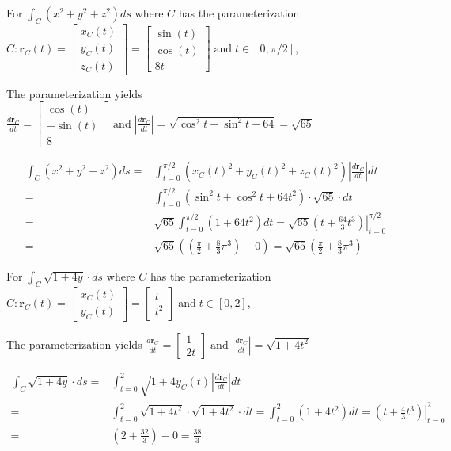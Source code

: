 \documentclass{article}
\newcommand{\abs}[1]{\left|#1\right|}
\newcommand{\at}[1]{\left. #1 \right|}
\newcommand{\dr}[1]{\textcolor{dark_red}{#1}}
\begin{document}
\begin{framed}
\dr{For \(\int_C (x^2 + y^2 + z^2)ds\) where \(C\) has the parameterization \(C: \mathbf{r}_C(t) = \begin{bmatrix} x_C(t) \\ y_C(t) \\ z_C(t) \end{bmatrix} =  \begin{bmatrix} \sin(t) \\ \cos(t) \\ 8t \end{bmatrix} \;\text{and}\; t \in [0,\pi/2]\),}

\dr{The parameterization yields \(\frac{d\mathbf{r}_C}{dt} = \begin{bmatrix} \cos(t) \\ -\sin(t) \\ 8 \end{bmatrix} \;\text{and}\; \abs{\frac{d\mathbf{r}_C}{dt}} = \sqrt{\cos^2t + \sin^2t + 64} = \sqrt{65}\)}

\dr{\begin{align*}
\int_C (x^2 + y^2 + z^2)ds = & \int_{t=0}^{\pi/2} (x_C(t)^2 + y_C(t)^2 + z_C(t)^2)\abs{\frac{d\mathbf{r}_C}{dt}}dt \\
= & \int_{t = 0}^{\pi/2} (\sin^2t + \cos^2t + 64t^2) \cdot \sqrt{65} \cdot dt \\
= & \sqrt{65}\int_{t = 0}^{\pi/2} (1 + 64t^2) dt 
= \sqrt{65}\at{(t + \frac{64}{3}t^3)}_{t = 0}^{\pi/2} \\
= & \sqrt{65}((\frac{\pi}{2} + \frac{8}{3}\pi^3) - 0) 
= \sqrt{65}(\frac{\pi}{2} + \frac{8}{3}\pi^3)
\end{align*}}
\end{framed}

\begin{framed}
\dr{For \(\int_C \sqrt{1 + 4y} \cdot ds\) where \(C\) has the parameterization \(C: \mathbf{r}_C(t) = \begin{bmatrix} x_C(t) \\ y_C(t) \end{bmatrix} = \begin{bmatrix} t \\ t^2 \end{bmatrix} \;\text{and}\; t \in [0,2]\),}

\dr{The parameterization yields \(\frac{d\mathbf{r}_C}{dt} = \begin{bmatrix} 1 \\ 2t \end{bmatrix} \;\text{and}\; \abs{\frac{d\mathbf{r}_C}{dt}} = \sqrt{1 + 4t^2}\)}

\dr{\begin{align*}
\int_C \sqrt{1 + 4y} \cdot ds = & \int_{t = 0}^2 \sqrt{1 + 4y_C(t)} \abs{\frac{d\mathbf{r}_C}{dt}}dt \\
= & \int_{t = 0}^2 \sqrt{1 + 4t^2} \cdot \sqrt{1 + 4t^2} \cdot dt 
= \int_{t = 0}^2 (1 + 4t^2) dt 
= \at{(t + \frac{4}{3}t^3)}_{t = 0}^2 \\
= & (2 + \frac{32}{3}) - 0 = \frac{38}{3}
\end{align*}}
\end{framed}
\end{document}
